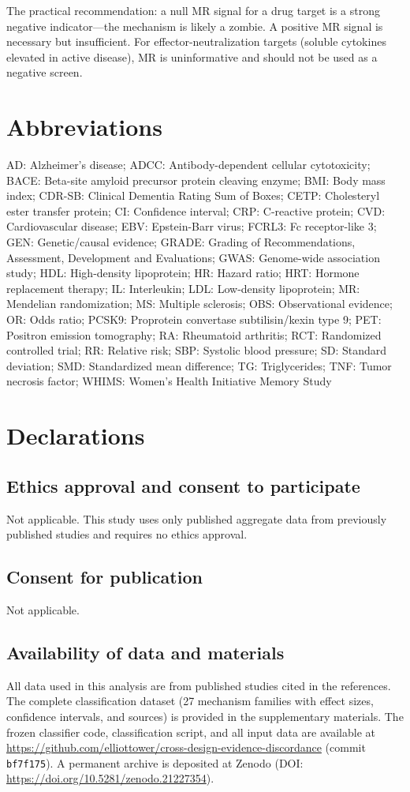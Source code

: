 \documentclass[11pt]{article}
\begin{document}
The practical recommendation: a null MR signal for a drug target is a strong negative indicator---the mechanism is likely a zombie. A positive MR signal is necessary but insufficient. For effector-neutralization targets (soluble cytokines elevated in active disease), MR is uninformative and should not be used as a negative screen.

\section*{Abbreviations}
AD: Alzheimer's disease;
ADCC: Antibody-dependent cellular cytotoxicity;
BACE: Beta-site amyloid precursor protein cleaving enzyme;
BMI: Body mass index;
CDR-SB: Clinical Dementia Rating Sum of Boxes;
CETP: Cholesteryl ester transfer protein;
CI: Confidence interval;
CRP: C-reactive protein;
CVD: Cardiovascular disease;
EBV: Epstein-Barr virus;
FCRL3: Fc receptor-like 3;
GEN: Genetic/causal evidence;
GRADE: Grading of Recommendations, Assessment, Development and Evaluations;
GWAS: Genome-wide association study;
HDL: High-density lipoprotein;
HR: Hazard ratio;
HRT: Hormone replacement therapy;
IL: Interleukin;
LDL: Low-density lipoprotein;
MR: Mendelian randomization;
MS: Multiple sclerosis;
OBS: Observational evidence;
OR: Odds ratio;
PCSK9: Proprotein convertase subtilisin/kexin type 9;
PET: Positron emission tomography;
RA: Rheumatoid arthritis;
RCT: Randomized controlled trial;
RR: Relative risk;
SBP: Systolic blood pressure;
SD: Standard deviation;
SMD: Standardized mean difference;
TG: Triglycerides;
TNF: Tumor necrosis factor;
WHIMS: Women's Health Initiative Memory Study

\section*{Declarations}

\subsection*{Ethics approval and consent to participate}
Not applicable. This study uses only published aggregate data from previously published studies and requires no ethics approval.

\subsection*{Consent for publication}
Not applicable.

\subsection*{Availability of data and materials}
All data used in this analysis are from published studies cited in the references. The complete classification dataset (27 mechanism families with effect sizes, confidence intervals, and sources) is provided in the supplementary materials. The frozen classifier code, classification script, and all input data are available at \url{https://github.com/elliottower/cross-design-evidence-discordance} (commit \texttt{bf7f175}). A permanent archive is deposited at Zenodo (DOI: \url{https://doi.org/10.5281/zenodo.21227354}).
\end{document}

